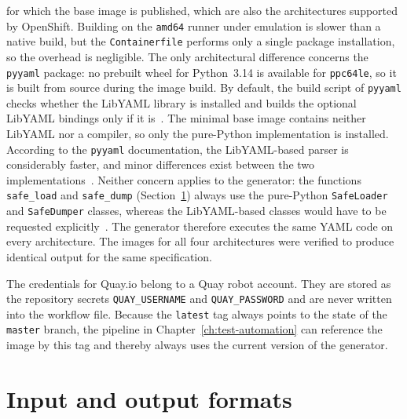 \documentclass[
  digital, %
  oneside, %
  lof,     %
  nolot,     %
]{fithesis4}
\begin{document}
for which the base image is published, which are also the architectures
supported by OpenShift. Building on the \texttt{amd64} runner under emulation
is slower than a native build, but the \texttt{Containerfile} performs only a
single package installation, so the overhead is negligible. The only
architectural difference concerns the \texttt{pyyaml} package: no prebuilt
wheel for Python~3.14 is available for \texttt{ppc64le}, so it is built from
source during the image build. By default, the build script of
\texttt{pyyaml} checks whether the LibYAML library is installed and builds the
optional LibYAML bindings only if it is~\cite{pyyaml-readme}. The minimal base
image contains neither LibYAML nor a compiler, so only the pure-Python
implementation is installed. According to the \texttt{pyyaml} documentation, the LibYAML-based
parser is considerably faster, and minor differences exist between the two
implementations~\cite{pyyaml}. Neither concern applies to the generator: the
functions \texttt{safe\_load} and \texttt{safe\_dump}
(Section~\ref{sec:formats}) always use the pure-Python \texttt{SafeLoader} and
\texttt{SafeDumper} classes, whereas the LibYAML-based classes would have to be
requested explicitly~\cite{pyyaml}. The generator therefore executes the same
\gls{YAML} code on every architecture. The images for all four architectures
were verified to produce identical output for the same specification.

The credentials for Quay.io belong to a Quay robot account. They are
stored as the repository secrets \texttt{QUAY\_USERNAME} and
\texttt{QUAY\_PASSWORD} and are never written into the workflow file. Because
the \texttt{latest} tag always points to the state of the \texttt{master}
branch, the pipeline in Chapter~\ref{ch:test-automation} can reference the
image by this tag and thereby always uses the current version of the generator.

\section{Input and output formats}
\label{sec:formats}
\end{document}

